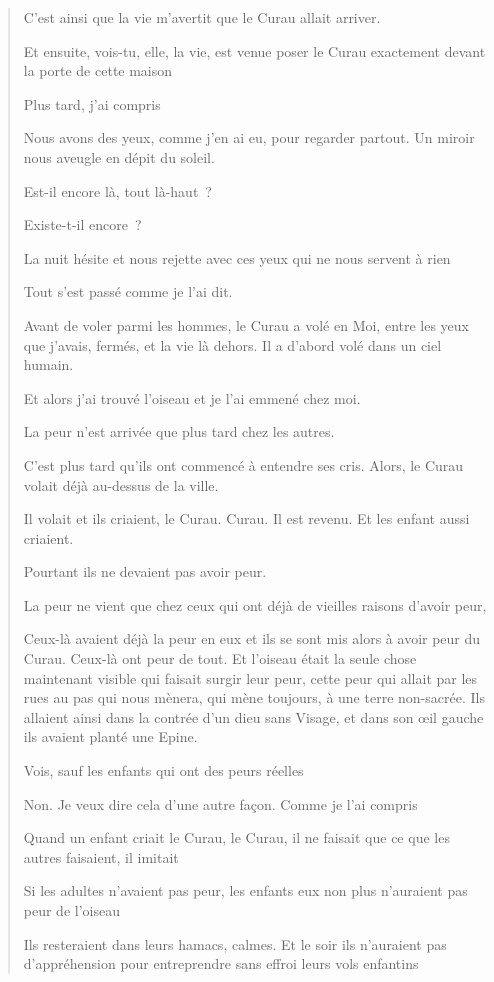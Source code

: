\begin{quote}
C'est ainsi que la vie m'avertit que le Curau allait arriver.

Et ensuite, vois-tu, elle, la vie, est venue poser le Curau exactement
devant la porte de cette maison

Plus tard, j'ai compris

Nous avons des yeux, comme j'en ai eu, pour regarder partout. Un miroir
nous aveugle en dépit du soleil.

Est-il encore là, tout là-haut~?

Existe-t-il encore~?

La nuit hésite et nous rejette avec ces yeux qui ne nous servent à rien

Tout s'est passé comme je l'ai dit.

Avant de voler parmi les hommes, le Curau a volé en Moi, entre les yeux
que j'avais, fermés, et la vie là dehors. Il a d'abord volé dans un ciel
humain.

Et alors j'ai trouvé l'oiseau et je l'ai emmené chez moi.

La peur n'est arrivée que plus tard chez les autres.

C'est plus tard qu'ils ont commencé à entendre ses cris. Alors, le Curau
volait déjà au-dessus de la ville.

Il volait et ils criaient, le Curau. Curau. Il est revenu. Et les enfant
aussi criaient.

Pourtant ils ne devaient pas avoir peur.

La peur ne vient que chez ceux qui ont déjà de vieilles raisons d'avoir
peur,

Ceux-là avaient déjà la peur en eux et ils se sont mis alors à avoir
peur du Curau. Ceux-là ont peur de tout. Et l'oiseau était la seule
chose maintenant visible qui faisait surgir leur peur, cette peur qui
allait par les rues au pas qui nous mènera, qui mène toujours, à une
terre non-sacrée. Ils allaient ainsi dans la contrée d'un dieu sans
Visage, et dans son œil gauche ils avaient planté une Epine.

Vois, sauf les enfants qui ont des peurs réelles

Non. Je veux dire cela d'une autre façon. Comme je l'ai compris

Quand un enfant criait le Curau, le Curau, il ne faisait que ce que les
autres faisaient, il imitait

Si les adultes n'avaient pas peur, les enfants eux non plus n'auraient
pas peur de l'oiseau

Ils resteraient dans leurs hamacs, calmes. Et le soir ils n'auraient pas
d'appréhension pour entreprendre sans effroi leurs vols enfantins


\end{quote}
